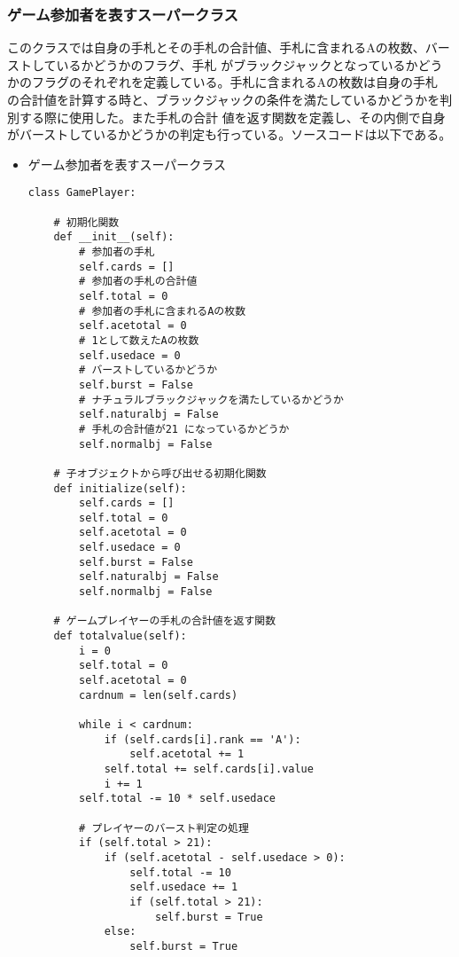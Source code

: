 \subsubsection{ゲーム参加者を表すスーパークラス}
このクラスでは自身の手札とその手札の合計値、手札に含まれるAの枚数、バーストしているかどうかのフラグ、手札
がブラックジャックとなっているかどうかのフラグのそれぞれを定義している。手札に含まれるAの枚数は自身の手札
の合計値を計算する時と、ブラックジャックの条件を満たしているかどうかを判別する際に使用した。また手札の合計
値を返す関数を定義し、その内側で自身がバーストしているかどうかの判定も行っている。ソースコードは以下である。
\begin{itemize}
\item ゲーム参加者を表すスーパークラス
\begin{lstlisting}
class GamePlayer:

    # 初期化関数
    def __init__(self):
        # 参加者の手札
        self.cards = []  
        # 参加者の手札の合計値
        self.total = 0  
        # 参加者の手札に含まれるAの枚数
        self.acetotal = 0  
        # 1として数えたAの枚数
        self.usedace = 0  
        # バーストしているかどうか
        self.burst = False  
        # ナチュラルブラックジャックを満たしているかどうか
        self.naturalbj = False 
        # 手札の合計値が21 になっているかどうか
        self.normalbj = False  

    # 子オブジェクトから呼び出せる初期化関数
    def initialize(self):
        self.cards = []
        self.total = 0
        self.acetotal = 0
        self.usedace = 0
        self.burst = False
        self.naturalbj = False
        self.normalbj = False

    # ゲームプレイヤーの手札の合計値を返す関数
    def totalvalue(self):
        i = 0
        self.total = 0
        self.acetotal = 0
        cardnum = len(self.cards)

        while i < cardnum:
            if (self.cards[i].rank == 'A'):
                self.acetotal += 1
            self.total += self.cards[i].value
            i += 1
        self.total -= 10 * self.usedace

        # プレイヤーのバースト判定の処理
        if (self.total > 21):
            if (self.acetotal - self.usedace > 0):
                self.total -= 10
                self.usedace += 1
                if (self.total > 21):
                    self.burst = True
            else:
                self.burst = True

\end{lstlisting}
\end{itemize}


